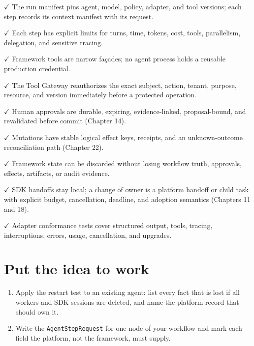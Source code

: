 \textbf{\ensuremath{\checkmark}} The run manifest pins agent, model, policy, adapter, and tool versions; each step records its context manifest with its request.\par

\textbf{\ensuremath{\checkmark}} Each step has explicit limits for turns, time, tokens, cost, tools, parallelism, delegation, and sensitive tracing.\par

\textbf{\ensuremath{\checkmark}} Framework tools are narrow façades; no agent process holds a reusable production credential.\par

\textbf{\ensuremath{\checkmark}} The Tool Gateway reauthorizes the exact subject, action, tenant, purpose, resource, and version immediately before a protected operation.\par

\textbf{\ensuremath{\checkmark}} Human approvals are durable, expiring, evidence-linked, proposal-bound, and revalidated before commit (Chapter 14).\par

\textbf{\ensuremath{\checkmark}} Mutations have stable logical effect keys, receipts, and an unknown-outcome reconciliation path (Chapter 22).\par

\textbf{\ensuremath{\checkmark}} Framework state can be discarded without losing workflow truth, approvals, effects, artifacts, or audit evidence.\par

\textbf{\ensuremath{\checkmark}} SDK handoffs stay local; a change of owner is a platform handoff or child task with explicit budget, cancellation, deadline, and adoption semantics (Chapters 11 and 18).\par

\textbf{\ensuremath{\checkmark}} Adapter conformance tests cover structured output, tools, tracing, interruptions, errors, usage, cancellation, and upgrades.\par

\section{Put the idea to work}

\begin{enumerate}

\item Apply the restart test to an existing agent: list every fact that is lost if all workers and SDK sessions are deleted, and name the platform record that should own it.

\item Write the \lstinline[style=bookinline]!AgentStepRequest! for one node of your workflow and mark each field the platform, not the framework, must supply.

\end{enumerate}

